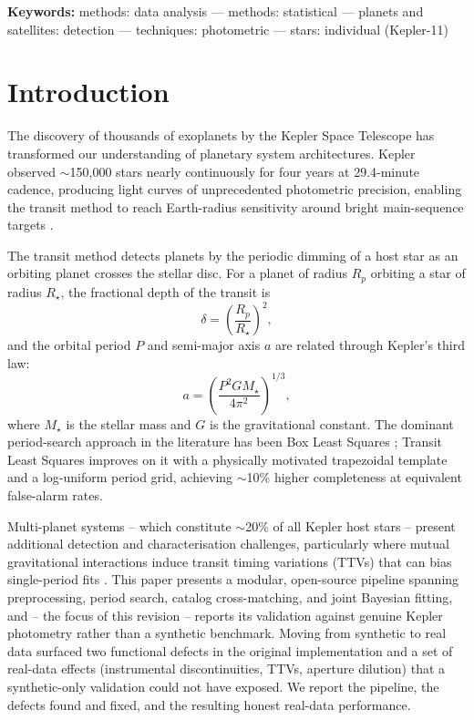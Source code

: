 \documentclass[11pt]{article}
\begin{document}
\noindent\textbf{Keywords:} methods: data analysis --- methods: statistical --- planets and satellites: detection --- techniques: photometric --- stars: individual (Kepler-11)

\section{Introduction}

The discovery of thousands of exoplanets by the Kepler Space Telescope \citep{Borucki2010} has transformed our understanding of planetary system architectures. Kepler observed $\sim$150{,}000 stars nearly continuously for four years at 29.4-minute cadence, producing light curves of unprecedented photometric precision, enabling the transit method to reach Earth-radius sensitivity around bright main-sequence targets \citep{Koch2010}.

The transit method detects planets by the periodic dimming of a host star as an orbiting planet crosses the stellar disc. For a planet of radius $R_p$ orbiting a star of radius $R_\star$, the fractional depth of the transit is
\begin{equation}
\delta = \left(\frac{R_p}{R_\star}\right)^2 ,
\label{eq:depth}
\end{equation}
and the orbital period $P$ and semi-major axis $a$ are related through Kepler's third law:
\begin{equation}
a = \left(\frac{P^2 G M_\star}{4\pi^2}\right)^{1/3},
\label{eq:kepler3}
\end{equation}
where $M_\star$ is the stellar mass and $G$ is the gravitational constant. The dominant period-search approach in the literature has been Box Least Squares \citep[BLS;][]{Kovacs2002}; Transit Least Squares \citep[TLS;][]{Hippke2019} improves on it with a physically motivated trapezoidal template and a log-uniform period grid, achieving $\sim$10\% higher completeness at equivalent false-alarm rates.

Multi-planet systems -- which constitute $\sim$20\% of all Kepler host stars \citep{Fabrycky2014} -- present additional detection and characterisation challenges, particularly where mutual gravitational interactions induce transit timing variations (TTVs) that can bias single-period fits \citep{Lissauer2011}. This paper presents a modular, open-source pipeline spanning preprocessing, period search, catalog cross-matching, and joint Bayesian fitting, and -- the focus of this revision -- reports its validation against genuine Kepler photometry rather than a synthetic benchmark. Moving from synthetic to real data surfaced two functional defects in the original implementation and a set of real-data effects (instrumental discontinuities, TTVs, aperture dilution) that a synthetic-only validation could not have exposed. We report the pipeline, the defects found and fixed, and the resulting honest real-data performance.
\end{document}
